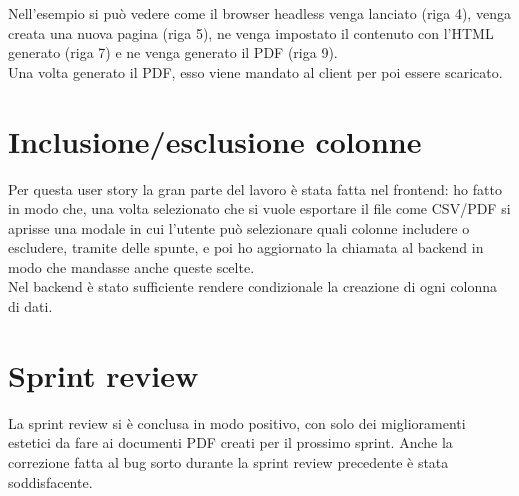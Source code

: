 \noindent Nell'esempio si può vedere come il browser headless venga lanciato (riga 4), venga creata una nuova pagina (riga 5), ne venga impostato il contenuto con l'HTML generato (riga 7) e ne venga generato il PDF (riga 9).\\
Una volta generato il PDF, esso viene mandato al client per poi essere scaricato.

\section{Inclusione/esclusione colonne}
Per questa user story la gran parte del lavoro è stata fatta nel frontend: ho fatto in modo che, una volta selezionato che si vuole esportare il file come CSV/PDF si aprisse una modale in cui l'utente può selezionare quali colonne includere o escludere, tramite delle spunte, e poi ho aggiornato la chiamata al backend in modo che mandasse anche queste scelte.\\
Nel backend è stato sufficiente rendere condizionale la creazione di ogni colonna di dati.

\section{Sprint review}
La sprint review si è conclusa in modo positivo, con solo dei miglioramenti estetici da fare ai documenti PDF creati per il prossimo sprint. Anche la correzione fatta al bug sorto durante la sprint review precedente è stata soddisfacente. 